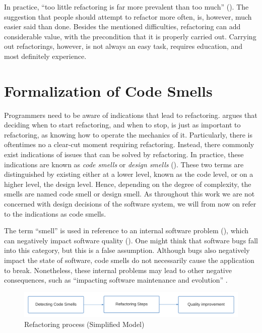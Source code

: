 In practice, 
	“too little refactoring is far more prevalent than too much” 
	(\cite{fowler2018}).
The suggestion that people should attempt to refactor more often, 
	is, however, much easier said than done.
Besides the mentioned difficulties, 
	refactoring can add considerable value, 
	with the precondition that it is properly carried out.
Carrying out refactorings, however, is not always an easy task, 
	requires education, and most definitely experience.


\section{Formalization of Code Smells}

Programmers need to be aware of indications that lead to refactoring.
\textcite{fowler2018} argues that deciding when to start refactoring,
	and when to stop,
	is just as important to refactoring,
	as knowing how to operate the mechanics of it.
Particularly, there is oftentimes no a clear-cut moment requiring refactoring. Instead, there commonly exist 
	indications of issues that can be solved by refactoring.
In practice, 
	these indications are known as \emph{code smells} or \emph{design smells} 
	(\cite{lacerda2020}).
These two terms are distinguished by existing either at a lower level,
	known as the code level, or on a higher level, 
	the design level. 
Hence, 
	depending on the degree of complexity, 
	the smells are named code smell or design smell.
As throughout this work we are not concerned 
	with design decisions of the software system, 
	we will from now on refer to the indications as code smells.

The term “smell” is used in reference to an internal software problem
	(\cite{lacerda2020}), 
	which can negatively impact software quality 
	(\cite{sonnleithner2021}). 
One might think that software bugs fall into this category, 
	but this is a false assumption.
Although bugs also negatively impact the state of software, 
	code smells do not necessarily cause the application to break.
Nonetheless, these internal problems may lead to other negative consequences,
	such as “impacting software maintenance and evolution”
	\cite{lacerda2020}.
 
\begin{figure}[htp]
    \centering
    \includegraphics[width=\textwidth]{./assets/simple_process.png}
    \caption{Refactoring process (Simplified Model)}
\end{figure}

